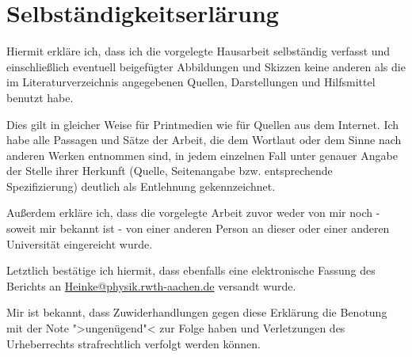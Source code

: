 
\chapter{Selbständigkeitserlärung}
%


Hiermit erkläre ich, dass ich die vorgelegte Hausarbeit selbständig verfasst und einschließlich eventuell beigefügter Abbildungen und Skizzen keine anderen als die im Literaturverzeichnis angegebenen Quellen, Darstellungen und Hilfsmittel benutzt habe.\par

Dies gilt in gleicher Weise für Printmedien wie für Quellen aus dem Internet. Ich habe alle Passagen und Sätze der Arbeit, die dem Wortlaut oder dem Sinne nach anderen Werken entnommen sind, in jedem einzelnen Fall unter genauer Angabe der Stelle ihrer Herkunft (Quelle, Seitenangabe bzw. entsprechende Spezifizierung) deutlich als Entlehnung gekennzeichnet.\par

Außerdem erkläre ich, dass die vorgelegte Arbeit zuvor weder von mir noch - soweit mir bekannt ist - von einer anderen Person an dieser oder einer anderen Universität eingereicht wurde.\par

Letztlich bestätige ich hiermit, dass ebenfalls eine elektronische Fassung des Berichts an \href{mailto:Heinke@physik.rwth-aachen.de}{Heinke@physik.rwth-aachen.de} versandt wurde.\par

Mir ist bekannt, dass Zuwiderhandlungen gegen diese Erklärung die Benotung mit der Note ">ungenügend"< zur Folge haben und Verletzungen des Urheberrechts strafrechtlich verfolgt werden können.

